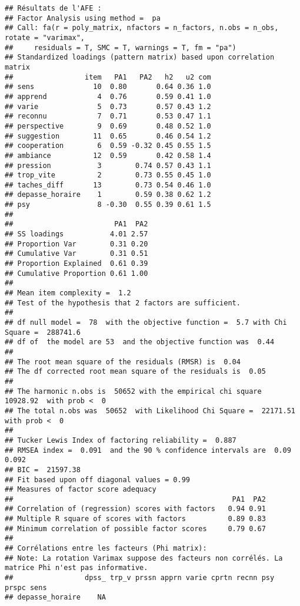 \documentclass[
]{article}
\begin{document}
\begin{verbatim}
## Résultats de l'AFE :
## Factor Analysis using method =  pa
## Call: fa(r = poly_matrix, nfactors = n_factors, n.obs = n_obs, rotate = "varimax", 
##     residuals = T, SMC = T, warnings = T, fm = "pa")
## Standardized loadings (pattern matrix) based upon correlation matrix
##                 item   PA1   PA2   h2   u2 com
## sens              10  0.80       0.64 0.36 1.0
## apprend            4  0.76       0.59 0.41 1.0
## varie              5  0.73       0.57 0.43 1.2
## reconnu            7  0.71       0.53 0.47 1.1
## perspective        9  0.69       0.48 0.52 1.0
## suggestion        11  0.65       0.46 0.54 1.2
## cooperation        6  0.59 -0.32 0.45 0.55 1.5
## ambiance          12  0.59       0.42 0.58 1.4
## pression           3        0.74 0.57 0.43 1.1
## trop_vite          2        0.73 0.55 0.45 1.0
## taches_diff       13        0.73 0.54 0.46 1.0
## depasse_horaire    1        0.59 0.38 0.62 1.2
## psy                8 -0.30  0.55 0.39 0.61 1.5
## 
##                        PA1  PA2
## SS loadings           4.01 2.57
## Proportion Var        0.31 0.20
## Cumulative Var        0.31 0.51
## Proportion Explained  0.61 0.39
## Cumulative Proportion 0.61 1.00
## 
## Mean item complexity =  1.2
## Test of the hypothesis that 2 factors are sufficient.
## 
## df null model =  78  with the objective function =  5.7 with Chi Square =  288741.6
## df of  the model are 53  and the objective function was  0.44 
## 
## The root mean square of the residuals (RMSR) is  0.04 
## The df corrected root mean square of the residuals is  0.05 
## 
## The harmonic n.obs is  50652 with the empirical chi square  10928.92  with prob <  0 
## The total n.obs was  50652  with Likelihood Chi Square =  22171.51  with prob <  0 
## 
## Tucker Lewis Index of factoring reliability =  0.887
## RMSEA index =  0.091  and the 90 % confidence intervals are  0.09 0.092
## BIC =  21597.38
## Fit based upon off diagonal values = 0.99
## Measures of factor score adequacy             
##                                                    PA1  PA2
## Correlation of (regression) scores with factors   0.94 0.91
## Multiple R square of scores with factors          0.89 0.83
## Minimum correlation of possible factor scores     0.79 0.67
## 
## Corrélations entre les facteurs (Phi matrix):
## Note: La rotation Varimax suppose des facteurs non corrélés. La matrice Phi n'est pas informative.
##                 dpss_ trp_v prssn apprn varie cprtn recnn psy   prspc sens 
## depasse_horaire    NA                                                      

\end{verbatim}
\end{document}
